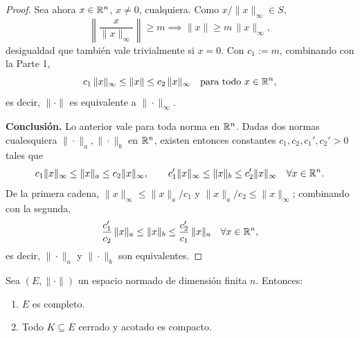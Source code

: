 \begin{proof}
Sea ahora $x\in\mathbb{R}^n$, $x\ne0$, cualquiera. Como $x/\|x\|_\infty \in S$,
\[
\left\|\frac{x}{\|x\|_\infty}\right\| \ge m \implies \|x\| \ge
m\,\|x\|_\infty,
\]
desigualdad que también vale trivialmente si $x=0$. Con $c_1:=m$,
combinando con la Parte 1,
\[
c_1\,\|x\|_\infty \le \|x\| \le c_2\,\|x\|_\infty \quad \text{para
todo } x\in\mathbb{R}^n,
\]
es decir, $\|\cdot\|$ es equivalente a $\|\cdot\|_\infty$.

\textbf{Conclusión.} Lo anterior vale para toda norma en $\mathbb{R}^n$. Dadas
dos normas cualesquiera $\|\cdot\|_a,\|\cdot\|_b$ en $\mathbb{R}^n$, existen
entonces constantes $c_1,c_2,c_1',c_2'>0$ tales que
\[
c_1\|x\|_\infty \le \|x\|_a \le c_2\|x\|_\infty, \qquad
c_1'\|x\|_\infty \le \|x\|_b \le c_2'\|x\|_\infty
\quad \forall x\in\mathbb{R}^n.
\]
De la primera cadena, $\|x\|_\infty \le \|x\|_a/c_1$ y
$\|x\|_a/c_2 \le \|x\|_\infty$; combinando con la segunda,
\[
\frac{c_1'}{c_2}\,\|x\|_a \le \|x\|_b \le \frac{c_2'}{c_1}\,\|x\|_a
\quad \forall x\in\mathbb{R}^n,
\]
es decir, $\|\cdot\|_a$ y $\|\cdot\|_b$ son equivalentes.
\end{proof}

\begin{cor}
Sea $(E,\|\cdot\|)$ un espacio normado de dimensión finita $n$.
Entonces:
\begin{enumerate}[label=(\roman*)]
    \item $E$ es completo.
    \item Todo $K\subseteq E$ cerrado y acotado es compacto.
\end{enumerate}
\end{cor}

